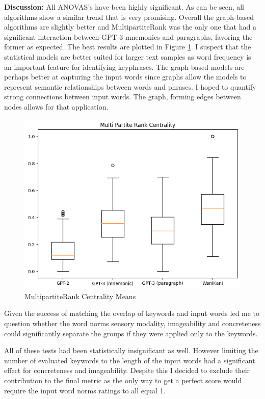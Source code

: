 \textbf{Discussion:} All ANOVAS's have been highly significant. As can be seen, all algorithms show a similar trend that is very promising. Overall the graph-based algorithms are slightly better and MultipartiteRank was the only one that had a significant interaction between GPT-3 mnemonics and paragraphs, favoring the former as expected. The best results are plotted in Figure \ref{figure:mpr_centrality}. I suspect that the statistical models are better suited for larger text samples as word frequency is an important feature for identifying keyphrases. The graph-based models are perhaps better at capturing the input words since graphs allow the models to represent semantic relationships between words and phrases. I hoped to quantify strong connections between input words. The graph, forming edges between nodes allows for that application.
\begin{figure}
    \centering
    \includegraphics[width=400pt]{resources/mpr_centrality.png}
    \caption{MultipartiteRank Centrality Means}
    \label{figure:mpr_centrality}
\end{figure}

Given the success of matching the overlap of keywords and input words led me to question whether the word norms sensory modality, imageability and concreteness could significantly separate the groups if they were applied only to the keywords.

All of these tests had been statistically insignificant as well. However limiting the number of evaluated keywords to the length of the input words had a significant effect for concreteness and imageability. Despite this I decided to exclude their contribution to the final metric as the only way to get a perfect score would require the input word norms ratings to all equal 1.

